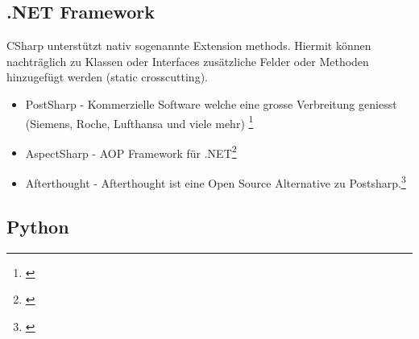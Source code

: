 \subsection{.NET Framework}

CSharp unterstützt nativ sogenannte Extension methods. Hiermit können nachträglich zu Klassen oder Interfaces zusätzliche Felder oder Methoden hinzugefügt werden (static crosscutting).

\begin{itemize}
\item PostSharp - Kommerzielle Software welche eine grosse Verbreitung geniesst (Siemens, Roche, Lufthansa und viele mehr) \footnote{\cite{net:postsharp}}
\item AspectSharp - AOP Framework für .NET\footnote{\cite{net:aspectsharp}}
\item Afterthought - Afterthought ist eine Open Source Alternative zu Postsharp.\footnote{\cite{net:afterthought}}
\end{itemize}

\subsection{Python}